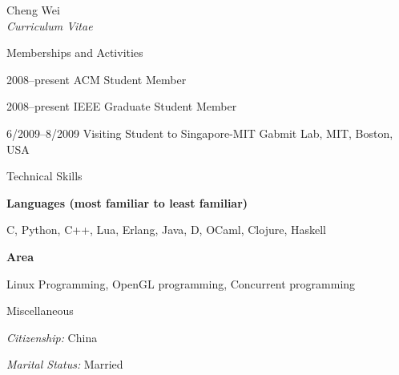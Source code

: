 \documentclass[10pt]{article}
\newenvironment{sublist}{%
	\begin{list}{}{%
		\setlength{\itemsep}{0em}\setlength{\parsep}{0em}%
		\setlength{\topsep}{0em}\setlength{\parskip}{0em}%
	}%
}%
{ \end{list} }
\begin{document}
\begin{cv}{Cheng Wei\\{\large \itshape Curriculum Vitae}}
\setlength{\oldcvlabelwidth}{\cvlabelwidth}
\setlength{\cvlabelwidth}{1em}


\begin{cvlist}{Memberships and Activities}
	\item[2008--present] ACM Student Member
    \item[2008--present] IEEE Graduate Student Member
    \item[6/2009--8/2009] Visiting Student to Singapore-MIT Gabmit Lab, MIT, Boston, USA
\end{cvlist}

\setlength{\oldcvlabelwidth}{\cvlabelwidth}
\setlength{\cvlabelwidth}{1em}
\begin{cvlist}{Technical Skills}
	\item \textbf{Languages (most familiar to least familiar)}
	\begin{sublist}
    \item C, Python, C++, Lua, Erlang, Java, D, OCaml, Clojure, Haskell
	\end{sublist}
	\item \textbf{Area} 
	\begin{sublist}
		\item Linux Programming, OpenGL programming, Concurrent programming
        \end{sublist}
\end{cvlist}
\setlength{\cvlabelwidth}{\oldcvlabelwidth}

\setlength{\oldcvlabelwidth}{\cvlabelwidth}
\setlength{\cvlabelwidth}{1em}
\begin{cvlist}{Miscellaneous}
\item \textit{Citizenship:} China
\item \textit{Marital Status:} Married
\end{cvlist}
\setlength{\cvlabelwidth}{\oldcvlabelwidth}

\end{cv}
\end{document}

